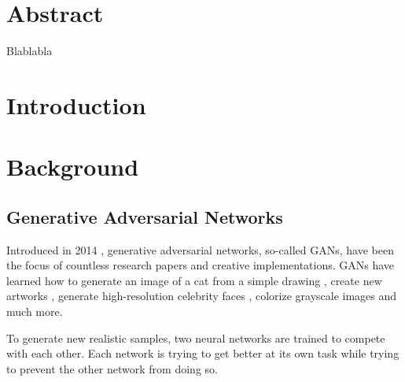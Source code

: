 \documentclass[12pt]{report}
\begin{document}


\chapter*{Abstract}
Blablabla
\clearpage

\pagestyle{plain}
\renewcommand{\baselinestretch}{0.75}\normalsize
\tableofcontents
\renewcommand{\baselinestretch}{1.0}\normalsize
\clearpage


\pagestyle{fancy}
\fancyhf{}
\lhead{\slshape\nouppercase{\rightmark}}
\rhead{ \thepage}
\renewcommand{\headrulewidth}{.5pt}
\chapter{Introduction}


\newpage
\chapter{Background}
\section{Generative Adversarial Networks}

Introduced in 2014 \cite{goodfellow_generative_2014}, generative adversarial  networks, so-called GANs, have been the focus of countless research papers and creative implementations. GANs have learned how to generate an image of a cat from a simple drawing \cite{hesse_image--image_nodate}, create new artworks \cite{rkjones4_gangogh_2018}, generate high-resolution celebrity faces \cite{karras_progressive_2017}, colorize grayscale images and much more.

To generate new realistic samples, two neural networks are trained to compete with each other. Each network is trying to get better at its own task while trying to prevent the other network from doing so. 
\end{document}
